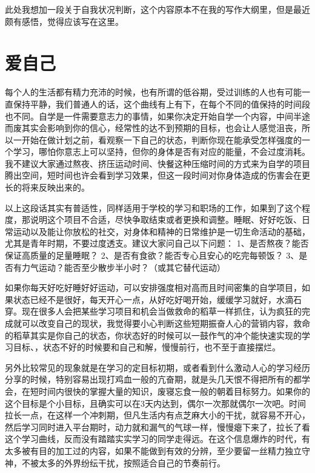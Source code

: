 \documentclass[
]{book}
\begin{document}
此处我想加一段关于自我状况判断，这个内容原本不在我的写作大纲里，但是最近颇有感悟，觉得应该写在这里。

\hypertarget{ux7231ux81eaux5df1}{%
\section{爱自己}\label{ux7231ux81eaux5df1}}

每个人的生活都有精力充沛的时候，也有所谓的低谷期，受过训练的人也有可能一直保持平静，我们普通人的话，这个曲线有上有下，在每个不同的值保持的时间段也不同。自学是一件需要意志力的事情，如果你决定开始自学一个内容，中间半途而废其实会影响到你的信心，经常性的达不到预期的目标，也会让人感觉沮丧，所以一开始在做计划之前，看观察一下自己的状态，判断你现在能承受怎样强度的一个学习，哪怕你意志上可以坚持，但你的身体是否有对应的能量，不会过度消耗。我不建议大家通过熬夜、挤压运动时间、快餐这种压缩时间的方式来为自学的项目腾出空间，短时间也许会看到学习效果，但这一段时间对你身体造成的伤害会在更长的将来反映出来的。

以上这段话其实有普适性，同样适用于学校的学习和职场的工作，如果到了这个程度，那说明这个项目不合适，尽快争取结束或者更换和调整。睡眠、好好吃饭、日常运动以及能让你放松的社交，对身体和精神的日常维护是一切生命活动的基础，尤其是青年时期，不要过度透支。建议大家问自己以下问题：
1、是否熬夜？能否保证高质量的足量睡眠？
2、是否有食欲？能否专心且安心的吃完每顿饭？
3、是否有力气运动？能否至少散步半小时？（或其它替代运动）

如果你每天好吃好睡好好运动，可以安排强度相对高而且时间密集的自学项目，如果状态已经不是很好，每天开心一点，从好吃好喝开始，缓缓学习就好，水滴石穿。现在很多人会把某些学习项目和机会当做救命的稻草一样抓住，认为疯狂的完成就可以改变自己的现状，我觉得要小心判断这些短期振奋人心的营销内容，救命的稻草其实是你自己的状态，你状态好的时候可以一鼓作气的冲个能快速实现的学习目标、，状态不好的时候要和自己和解，慢慢前行，也不至于直接摆烂。

另外比较常见的现象就是在学习的定目标初期，或者看到什么激动人心的学习经历分享的时候，特别容易出现打鸡血一般的亢奋期，就是头几天恨不得把所有的都学会，在短时间内很快的掌握大量的知识，废寝忘食一般的朝着目标努力。如果你的这个目标是个小目标，且确实可以在3天内达到，偶尔一次那就偶尔一次吧。时间拉长一点，在这样一个冲刺期，但凡生活内有点芝麻大小的干扰，就容易不开心，然后学习同时进入平台期时，动力就和漏气的气球一样，慢慢瘪下来了，拉长了看这个学习曲线，反而没有踏踏实实学习的同学走得远。在这个信息爆炸的时代，有太多被有目的加工过的内容，如果不能做到有效的分辨，至少要留一丝精力独立守神，不被太多的外界纷纭干扰，按照适合自己的节奏前行。
\end{document}
